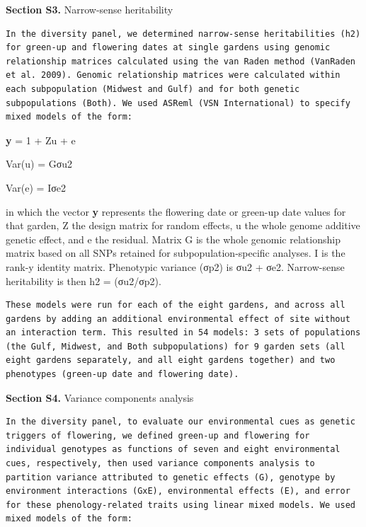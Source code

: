 \documentclass[
  letterpaper,
  DIV=11,
  numbers=noendperiod]{scrartcl}
\begin{document}
\hfill\break

\textbf{Section S3.} Narrow-sense heritability~

\begin{verbatim}
In the diversity panel, we determined narrow-sense heritabilities (h2) for green-up and flowering dates at single gardens using genomic relationship matrices calculated using the van Raden method (VanRaden et al. 2009). Genomic relationship matrices were calculated within each subpopulation (Midwest and Gulf) and for both genetic subpopulations (Both). We used ASReml (VSN International) to specify mixed models of the form:
\end{verbatim}

\textbf{y} = 1 + Zu + e

Var(u) = Gσu2

Var(e) = Iσe2

in which the vector \textbf{y} represents the flowering date or green-up
date values for that garden, Z the design matrix for random effects, u
the whole genome additive genetic effect, and e the residual. Matrix G
is the whole genomic relationship matrix based on all SNPs retained for
subpopulation-specific analyses. I is the rank-y identity matrix.
Phenotypic variance (σp2) is σu2 + σe2. Narrow-sense heritability is
then h2 = (σu2/σp2).

\begin{verbatim}
These models were run for each of the eight gardens, and across all gardens by adding an additional environmental effect of site without an interaction term. This resulted in 54 models: 3 sets of populations (the Gulf, Midwest, and Both subpopulations) for 9 garden sets (all eight gardens separately, and all eight gardens together) and two phenotypes (green-up date and flowering date).
\end{verbatim}

\hfill\break

\textbf{Section S4.} Variance components analysis

\begin{verbatim}
In the diversity panel, to evaluate our environmental cues as genetic triggers of flowering, we defined green-up and flowering for individual genotypes as functions of seven and eight environmental cues, respectively, then used variance components analysis to partition variance attributed to genetic effects (G), genotype by environment interactions (GxE), environmental effects (E), and error for these phenology-related traits using linear mixed models. We used mixed models of the form:
\end{verbatim}
\end{document}

